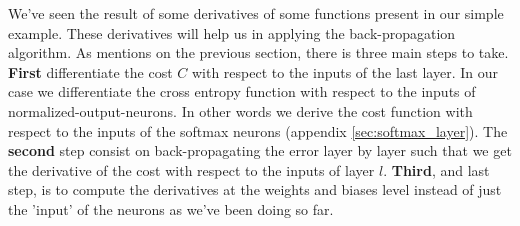			We've seen the result of some derivatives of some functions present in our simple example. These derivatives will help us in applying the back-propagation algorithm. As mentions on the previous section, there is three main steps to take. \textbf{First} differentiate the cost $C$ with respect to the inputs of the last layer. In our case we differentiate the cross entropy function with respect to the inputs of normalized-output-neurons. In other words we derive the cost function with respect to the inputs of the softmax neurons (appendix \ref{sec:softmax_layer}). The \textbf{second} step consist on back-propagating the error layer by layer such that we get the derivative of the cost with respect to the inputs of layer $l$. \textbf{Third}, and last step, is to compute the derivatives at the weights and biases level instead of just the 'input' of the neurons as we've been doing so far.
